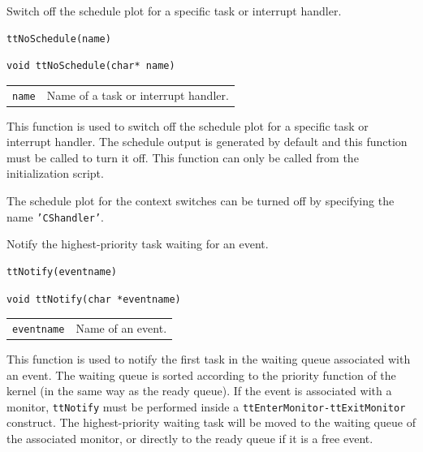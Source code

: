 \documentclass[final,twoside]{rapport}
\begin{document}

\purpose
Switch off the schedule plot for a specific task or interrupt
handler. 

\Msyntax
\begin{verbatim}
ttNoSchedule(name)
\end{verbatim}

\Csyntax
\begin{verbatim}
void ttNoSchedule(char* name)
\end{verbatim}

\args
\begin{tabularx}{\hsize}{l>{\raggedright\arraybackslash}X}
  {\tt name} & Name of a task or interrupt handler. \\
\end{tabularx}

\descr This function is used to switch off the schedule plot for
a specific task or interrupt handler. The schedule output is generated by
default and this function must be called to turn it off. This function
can only be called from the initialization script.

The schedule plot for the context switches can be turned off by
specifying the name \texttt{'CShandler'}.



\purpose
Notify the highest-priority task waiting for an event.

\Msyntax
\begin{verbatim}
ttNotify(eventname) 
\end{verbatim}

\Csyntax
\begin{verbatim}
void ttNotify(char *eventname) 
\end{verbatim}

\args
\begin{tabularx}{\hsize}{l>{\raggedright\arraybackslash}X}
  {\tt eventname} & Name of an event.
\end{tabularx}

\descr This function is used to notify the first task in the waiting
queue associated with an event. The waiting queue is sorted according
to the priority function of the kernel (in the same way as the ready
queue). If the event is associated with a monitor, {\tt ttNotify} must
be performed inside a \texttt{ttEnterMonitor-ttExitMo\-nitor}
construct. The highest-priority waiting task will be moved to the
waiting queue of the associated monitor, or directly to the ready
queue if it is a free event.
\end{document}

